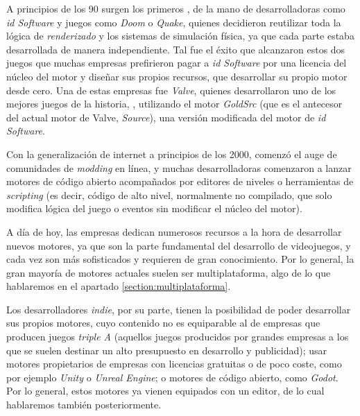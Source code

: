 \smallskip

A principios de los 90 surgen los primeros , de la mano de desarrolladoras como \textit{id Software} y juegos como \textit{Doom} o \textit{Quake}, quienes decidieron reutilizar toda la lógica de \textit{renderizado} y los sistemas de simulación física, ya que cada parte estaba desarrollada de manera independiente. Tal fue el éxito que alcanzaron estos dos juegos que muchas empresas prefirieron pagar a \textit{id Software} por una licencia del núcleo del motor y diseñar sus propios recursos, que desarrollar su propio motor desde cero. Una de estas empresas fue \textit{Valve}, quienes desarrollaron uno de los mejores juegos de la historia, , utilizando el motor \textit{GoldSrc} (que es el antecesor del actual motor de Valve, \textit{Source}), una versión modificada del motor de \textit{id Software}.

\medskip

Con la generalización de internet a principios de los 2000, comenzó el auge de comunidades de \textit{modding} en línea, y muchas desarrolladoras comenzaron a lanzar motores de código abierto acompañados por editores de niveles o herramientas de \textit{scripting} (es decir, código de alto nivel, normalmente no compilado, que solo modifica lógica del juego o eventos sin modificar el núcleo del motor).

\smallskip

A día de hoy, las empresas dedican numerosos recursos a la hora de desarrollar nuevos motores, ya que son la parte fundamental del desarrollo de videojuegos, y cada vez son más sofisticados y requieren de gran conocimiento. Por lo general, la gran mayoría de motores actuales suelen ser multiplataforma, algo de lo que hablaremos en el apartado \ref{section:multiplataforma}.

\smallskip

Los desarrolladores \textit{indie}, por su parte, tienen la posibilidad de poder desarrollar sus propios motores, cuyo contenido no es equiparable al de empresas que producen juegos \textit{triple A} (aquellos juegos producidos por grandes empresas a los que se suelen destinar un alto presupuesto en desarrollo y publicidad); usar motores propietarios de empresas con licencias gratuitas o de poco coste, como por ejemplo \textit{Unity} o \textit{Unreal Engine}; o motores de código abierto, como \textit{Godot}. Por lo general, estos motores ya vienen equipados con un editor, de lo cual hablaremos también posteriormente.

